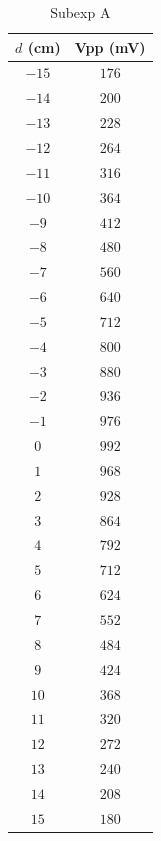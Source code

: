 \begin{table}[htb!]
\centering
\caption{Subexp A}
\begin{tabular}{cc}
\toprule
$d$ (\unit{\cm}) & Vpp (\unit{\mV}) \\
\midrule
$-15$ & $176$ \\
$-14$ & $200$ \\
$-13$ & $228$ \\
$-12$ & $264$ \\
$-11$ & $316$ \\
$-10$ & $364$ \\
$-9$ & $412$ \\
$-8$ & $480$ \\
$-7$ & $560$ \\
$-6$ & $640$ \\
$-5$ & $712$ \\
$-4$ & $800$ \\
$-3$ & $880$ \\
$-2$ & $936$ \\
$-1$ & $976$ \\
$0$ & $992$ \\
$1$ & $968$ \\
$2$ & $928$ \\
$3$ & $864$ \\
$4$ & $792$ \\
$5$ & $712$ \\
$6$ & $624$ \\
$7$ & $552$ \\
$8$ & $484$ \\
$9$ & $424$ \\
$10$ & $368$ \\
$11$ & $320$ \\
$12$ & $272$ \\
$13$ & $240$ \\
$14$ & $208$ \\
$15$ & $180$ \\
\bottomrule
\end{tabular}
\end{table}
